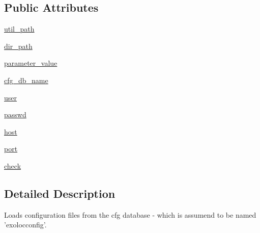 \subsection*{Public Attributes}
\begin{DoxyCompactItemize}
\item 
\hyperlink{classel__utils_1_1config__reader_1_1ConfigurationReader_afc84a6b37e7bb1cbc02889e1e0b82fc8}{util\-\_\-path}
\item 
\hyperlink{classel__utils_1_1config__reader_1_1ConfigurationReader_a2c815b532f9726b7c1f107b176fb4e9c}{dir\-\_\-path}
\item 
\hyperlink{classel__utils_1_1config__reader_1_1ConfigurationReader_a3742301e1c74431a62e2add169c61c6c}{parameter\-\_\-value}
\item 
\hyperlink{classel__utils_1_1config__reader_1_1ConfigurationReader_a2772d3603ee19298dd0b0b645fc391f8}{cfg\-\_\-db\-\_\-name}
\item 
\hyperlink{classel__utils_1_1config__reader_1_1ConfigurationReader_a2693245cf452f6a2679bb612a512c4ec}{user}
\item 
\hyperlink{classel__utils_1_1config__reader_1_1ConfigurationReader_a4ca8f69fc1f92b59646dfbcee9c5c98f}{passwd}
\item 
\hyperlink{classel__utils_1_1config__reader_1_1ConfigurationReader_a64babfab25620f80a3c3a305ae20f7a9}{host}
\item 
\hyperlink{classel__utils_1_1config__reader_1_1ConfigurationReader_af72d3d48ad04f29b72cf6700b8316987}{port}
\item 
\hyperlink{classel__utils_1_1config__reader_1_1ConfigurationReader_a5b97b484b6913656e459f8d054112567}{check}
\end{DoxyCompactItemize}


\subsection{Detailed Description}
Loads configuration files from the cfg database -\/ which is assumend to be named 'exolocconfig'. 

